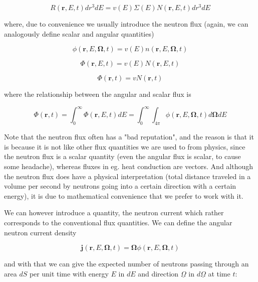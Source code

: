 \begin{equation}
R(\mathbf{r},E,t)dr^3dE=v(E)\Sigma(E) N(\mathbf{r},E,t)dr^3dE
\end{equation}

\noindent where, due to convenience we usually introduce the neutron flux (again, we can analogously define scalar and angular quantities)

\begin{equation}
\phi(\mathbf{r},E,\mathbf{\Omega},t)=v(E)n(\mathbf{r},E,\mathbf{\Omega},t)
\end{equation}

\begin{equation*}
\Phi(\mathbf{r},E,t)=v(E)N(\mathbf{r},E,t)
\end{equation*}

\begin{equation*}
\Phi(\mathbf{r},t)=vN(\mathbf{r},t)
\end{equation*}

\noindent where the relationship between the angular and scalar flux is

$$\Phi(\mathbf{r},t)=\int^\infty_0\Phi(\mathbf{r},E,t)dE=\int^\infty_0\int_{4\pi}\phi(\mathbf{r},E,\mathbf{\Omega},t)d\mathbf{\Omega}dE$$

Note that the neutron flux often has a "bad reputation", and the reason is that it is because it is not like other flux quantities we are used to from physics, since the neutron flux is a scalar quantity (even the angular flux is scalar, to cause some headache), whereas fluxes in eg. heat conduction are vectors. And although the neutron flux does have a physical interpretation (total distance traveled in a volume per second by neutrons going into a certain direction with a certain energy), it is due to mathematical convenience that we prefer to work with it. 

We can however introduce a quantity, the neutron current which rather corresponds to the conventional flux quantities. We can define the angular neutron current density

\begin{equation}
\mathbf{j}(\mathbf{r},E,\mathbf{\Omega},t)=\mathbf{\Omega}\phi(\mathbf{r},E,\mathbf{\Omega},t)
\end{equation}

\noindent and with that we can give the expected number of neutrons passing through an area $dS$ per unit time with energy $E$ in $dE$ and direction $\underline\Omega$ in $d\underline\Omega$ at time $t$:

